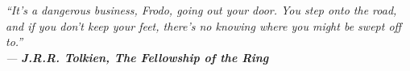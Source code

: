 
\vspace*{3.5cm}


\begin{flushright}{\slshape    
  ``It's a dangerous business, Frodo, going out your door. You step onto the road, and if you don't keep your feet, there's no knowing where you might be swept off to.''\\ \medskip
  --- \textbf{J.R.R. Tolkien, The Fellowship of the Ring}}
\end{flushright}
